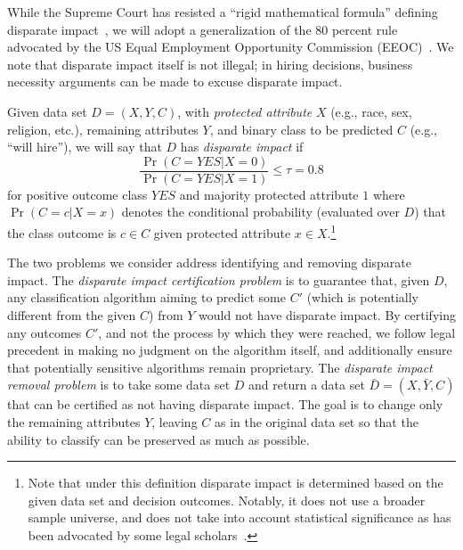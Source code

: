 While the Supreme Court has resisted a ``rigid mathematical formula'' defining disparate impact~\cite{watson1988}, we will adopt a generalization of the 80 percent rule advocated by the US Equal Employment Opportunity Commission (EEOC)~\cite{eeoc1979}. 
We note that disparate impact itself is not illegal; in hiring decisions, business necessity arguments can be made to excuse disparate impact.%
\begin{defn}
Given data set $D = (X, Y, C)$, with \emph{protected attribute} $X$ (e.g., race, sex, religion, etc.), remaining attributes $Y$, and binary class to be predicted $C$ (e.g., ``will hire''), we will say that $D$ has \emph{disparate impact}
if 
\[ \frac{\Pr(C = YES| X = 0)}{\Pr(C = YES| X = 1)} \leq \tau = 0.8 \]
for positive outcome class $YES$ and majority protected attribute $1$ where $\Pr(C = c | X = x)$ denotes the conditional probability (evaluated over $D$) that the class outcome is $c \in C$ given protected attribute $x \in X$.\footnote{Note that under this definition disparate impact is determined based on the given data set and decision outcomes. Notably, it does not use a broader sample universe, and does not take into account statistical significance as has been advocated by some legal scholars~\cite{peresie09law}.}
\end{defn}

 The two problems we consider address identifying and removing disparate impact.  The \emph{disparate impact certification problem} is to guarantee that, given $D$, any classification algorithm aiming to predict some $C'$ (which is potentially different from the given $C$) from $Y$ would not have disparate impact.  By certifying any outcomes $C'$, and not the process by which they were reached, we follow legal precedent in making no judgment on the algorithm itself, and additionally ensure that potentially sensitive algorithms remain proprietary.  The \emph{disparate impact removal problem} is to take some data set $D$ and return a data set $\bar{D} = (X, \bar{Y}, C)$ that can be certified as not having disparate impact.  The goal is to change only the remaining attributes $Y$, leaving $C$ as in the original data set so that the ability to classify can be preserved as much as possible.

